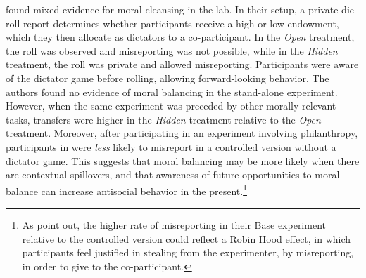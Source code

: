 \documentclass{article}
\begin{document}
\textcite{Ploner2013} found mixed evidence for moral cleansing in the lab. In their setup, a private die-roll report determines whether participants receive a high or low endowment, which they then allocate as dictators to a co-participant. In the \textit{Open} treatment, the roll was observed and misreporting was not possible, while in the \textit{Hidden} treatment, the roll was private and allowed misreporting. Participants were aware of the dictator game before rolling, allowing forward-looking behavior. The authors found no evidence of moral balancing in the stand-alone experiment. However, when the same experiment was preceded by other morally relevant tasks, transfers were higher in the \textit{Hidden} treatment relative to the \textit{Open} treatment. Moreover, after participating in an experiment involving philanthropy, participants in \textcite{Ploner2013} were \textit{less} likely to misreport in a controlled version without a dictator game. This suggests that moral balancing may be more likely when there are contextual spillovers, and that awareness of future opportunities to moral balance can increase antisocial behavior in the present.\footnote{As \textcite{Ploner2013} point out, the higher rate of misreporting in their Base experiment relative to the controlled version could reflect a Robin Hood effect, in which participants feel justified in stealing from the experimenter, by misreporting, in order to give to the co-participant.}
\par
\end{document}
